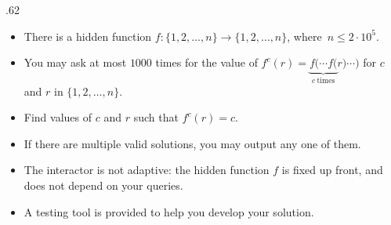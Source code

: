 \newcommand{\maxn}{2\cdot 10^5}
\newcommand{\maxq}{1000}

\begin{frame}
    \frametitle{\problemtitle}

    \begin{columns}
        \begin{column}[T]{.62\textwidth}
            \begin{itemize}
                \item There is a hidden function $f\colon \{1,2,\ldots,n\} \to \{1,2,\ldots,n\}$, where~$n \leq \maxn$.
                \item You may ask at most $\maxq$ times for the value of $f^c(r) = \underbrace{f(\cdots f(}_{c~\mathrm{times}}r)\cdots)$ for $c$ and $r$ in $\{1,2,\ldots,n\}$.
                \item Find values of $c$ and $r$ such that $f^c(r) = c$.
                \item If there are multiple valid solutions, you may output any one of them.
                \item The interactor is not adaptive: the hidden function $f$ is fixed up front, and does not depend on your queries.
                \item A testing tool is provided to help you develop your solution.
            \end{itemize}



        \end{column}

    \end{columns}
\end{frame}
